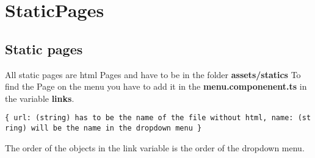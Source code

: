 \chapter*{StaticPages}

\section*{Static pages}

All static pages are html Pages and have to be in the folder
\textbf{assets/statics} To find the Page on the menu you have to add it
in the \textbf{menu.componenent.ts} in the variable \textbf{links}.

\texttt{\{\ url:\ (string)\ has\ to\ be\ the\ name\ of\ the\ file\ without\ html,\ name:\ (string)\ will\ be\ the\ name\ in\ the\ dropdown\ menu\ \}}

The order of the objects in the link variable is the order of the
dropdown menu.

